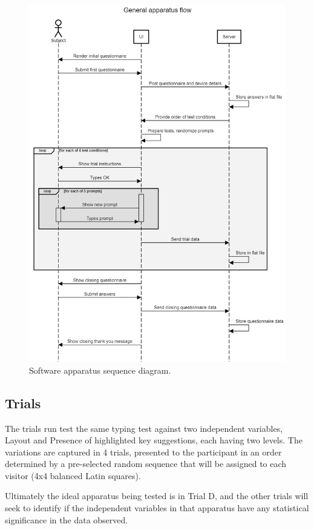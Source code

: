 \documentclass[english]{vgtc}
\begin{document}
\begin{figure}[!htb]
  \centering
  \includegraphics[width=1.1\columnwidth]{Sequence-light.png}
  \caption{Software apparatus sequence diagram.}
  \label{fig:sequence}
\end{figure}

\subsection{Trials}

The trials run test the same typing test against two independent
variables, Layout and Presence of highlighted key suggestions, each
having two levels. The variations are captured in 4 trials, presented 
to the participant in an order determined by a pre-selected
random sequence that will be assigned to each visitor (4x4 balanced Latin squares).

Ultimately the ideal apparatus being tested is in Trial D, and the
other trials will seek to identify if the independent variables in
that apparatus have any statistical significance in the data observed.
\end{document}
